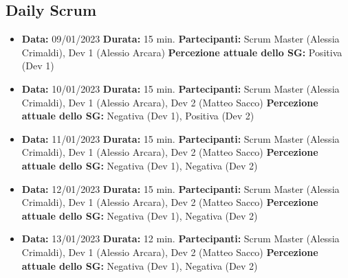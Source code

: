 \documentclass{article}
\begin{document}
    \subsection{Daily Scrum}
    \begin{itemize}
        \item \textbf{Data:} 09/01/2023
        \newline \textbf{Durata:} 15 min.
        \newline \textbf{Partecipanti:} Scrum Master (Alessia Crimaldi), Dev 1 (Alessio Arcara)
        \newline \textbf{Percezione attuale dello SG:} Positiva (Dev 1)
    \end{itemize}
    \begin{itemize}
        \item \textbf{Data:} 10/01/2023
        \newline \textbf{Durata:} 15 min.
        \newline \textbf{Partecipanti:} Scrum Master (Alessia Crimaldi), Dev 1 (Alessio Arcara), Dev 2 (Matteo Sacco)
        \newline \textbf{Percezione attuale dello SG:} Negativa (Dev 1), Positiva (Dev 2)
    \end{itemize}
    \begin{itemize}
        \item \textbf{Data:} 11/01/2023
        \newline \textbf{Durata:} 15 min.
        \newline \textbf{Partecipanti:} Scrum Master (Alessia Crimaldi), Dev 1 (Alessio Arcara), Dev 2 (Matteo Sacco)
        \newline \textbf{Percezione attuale dello SG:} Negativa (Dev 1), Negativa (Dev 2)
    \end{itemize}
    \begin{itemize}
        \item \textbf{Data:} 12/01/2023
        \newline \textbf{Durata:} 15 min.
        \newline \textbf{Partecipanti:} Scrum Master (Alessia Crimaldi), Dev 1 (Alessio Arcara), Dev 2 (Matteo Sacco)
        \newline \textbf{Percezione attuale dello SG:} Negativa (Dev 1), Negativa (Dev 2)
    \end{itemize}
    \begin{itemize}
        \item \textbf{Data:} 13/01/2023
        \newline \textbf{Durata:} 12 min.
        \newline \textbf{Partecipanti:} Scrum Master (Alessia Crimaldi), Dev 1 (Alessio Arcara), Dev 2 (Matteo Sacco)
        \newline \textbf{Percezione attuale dello SG:} Negativa (Dev 1), Negativa (Dev 2)
    \end{itemize}
\end{document}
